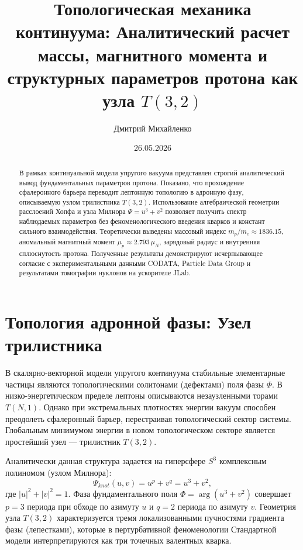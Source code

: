 \documentclass[12pt,a4paper]{article}
\title{Топологическая механика континуума: Аналитический расчет массы, магнитного момента и структурных параметров протона как узла $T(3,2)$}
\author{Дмитрий Михайленко}
\date{26.05.2026}
\begin{document}
	
	\maketitle
	
	\begin{abstract}
		В рамках континуальной модели упругого вакуума представлен строгий аналитический вывод фундаментальных параметров протона. Показано, что прохождение сфалеронного барьера переводит лептонную топологию в адронную фазу, описываемую узлом трилистника $T(3,2)$. Использование алгебраической геометрии расслоений Хопфа и узла Милнора $\Psi = u^3+v^2$ позволяет получить спектр наблюдаемых параметров без феноменологического введения кварков и констант сильного взаимодействия. Теоретически выведены массовый индекс $m_p/m_e \approx 1836.15$, аномальный магнитный момент $\mu_p \approx 2.793 \, \mu_N$, зарядовый радиус и внутренняя сплюснутость протона. Полученные результаты демонстрируют исчерпывающее согласие с экспериментальными данными CODATA, Particle Data Group и результатами томографии нуклонов на ускорителе JLab.
	\end{abstract}
	
	\section{Топология адронной фазы: Узел трилистника}
	
	В скалярно-векторной модели упругого континуума стабильные элементарные частицы являются топологическими солитонами (дефектами) поля фазы $\Phi$. В низко-энергетическом пределе лептоны описываются незаузленными торами $T(N,1)$. Однако при экстремальных плотностях энергии вакуум способен преодолеть сфалеронный барьер, перестраивая топологический сектор системы. Глобальным минимумом энергии в новом топологическом секторе является простейший узел — трилистник $T(3,2)$.
	
	Аналитически данная структура задается на гиперсфере $S^3$ комплексным полиномом (узлом Милнора):
	\begin{equation}
		\Psi_{knot}(u, v) = u^p + v^q = u^3 + v^2,
	\end{equation}
	где $|u|^2+|v|^2=1$. Фаза фундаментального поля $\Phi = \arg(u^3 + v^2)$ совершает $p=3$ периода при обходе по азимуту $u$ и $q=2$ периода по азимуту $v$. Геометрия узла $T(3,2)$ характеризуется тремя локализованными пучностями градиента фазы (лепестками), которые в пертурбативной феноменологии Стандартной модели интерпретируются как три точечных валентных кварка. 
	
\end{document}
